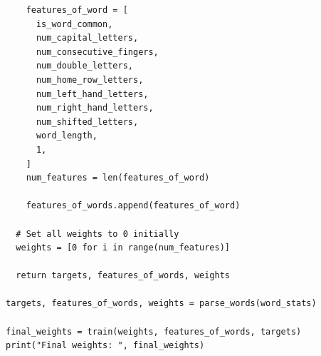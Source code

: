 \documentclass[12pt]{article}
\begin{document}
\begin{verbatim}
    features_of_word = [
      is_word_common,
      num_capital_letters,
      num_consecutive_fingers,
      num_double_letters,
      num_home_row_letters,
      num_left_hand_letters,
      num_right_hand_letters,
      num_shifted_letters,
      word_length,
      1,
    ]
    num_features = len(features_of_word)

    features_of_words.append(features_of_word)

  # Set all weights to 0 initially
  weights = [0 for i in range(num_features)]

  return targets, features_of_words, weights

targets, features_of_words, weights = parse_words(word_stats)

final_weights = train(weights, features_of_words, targets)
print("Final weights: ", final_weights)
\end{verbatim}
\end{document}
